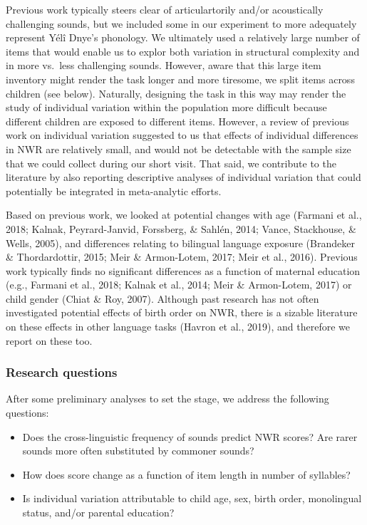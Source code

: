 \documentclass[english,,man,floatsintext]{apa6}
\providecommand{\tightlist}{%
  \setlength{\itemsep}{0pt}\setlength{\parskip}{0pt}}
\begin{document}
Previous work typically steers clear of articulartorily and/or
acoustically challenging sounds, but we included some in our experiment
to more adequately represent Yélî Dnye's phonology. We ultimately used a
relatively large number of items that would enable us to explor both
variation in structural complexity and in more vs.~less challenging
sounds. However, aware that this large item inventory might render the
task longer and more tiresome, we split items across children (see
below). Naturally, designing the task in this way may render the study
of individual variation within the population more difficult because
different children are exposed to different items. However, a review of
previous work on individual variation suggested to us that effects of
individual differences in NWR are relatively small, and would not be
detectable with the sample size that we could collect during our short
visit. That said, we contribute to the literature by also reporting
descriptive analyses of individual variation that could potentially be
integrated in meta-analytic efforts.

Based on previous work, we looked at potential changes with age (Farmani
et al., 2018; Kalnak, Peyrard-Janvid, Forssberg, \& Sahlén, 2014; Vance,
Stackhouse, \& Wells, 2005), and differences relating to bilingual
language exposure (Brandeker \& Thordardottir, 2015; Meir \&
Armon-Lotem, 2017; Meir et al., 2016). Previous work typically finds no
significant differences as a function of maternal education (e.g.,
Farmani et al., 2018; Kalnak et al., 2014; Meir \& Armon-Lotem, 2017) or
child gender (Chiat \& Roy, 2007). Although past research has not often
investigated potential effects of birth order on NWR, there is a sizable
literature on these effects in other language tasks (Havron et al.,
2019), and therefore we report on these too.

\subsubsection{Research questions}\label{research-questions}

After some preliminary analyses to set the stage, we address the
following questions:

\begin{itemize}
\tightlist
\item
  Does the cross-linguistic frequency of sounds predict NWR scores? Are
  rarer sounds more often substituted by commoner sounds?
\item
  How does score change as a function of item length in number of
  syllables?
\item
  Is individual variation attributable to child age, sex, birth order,
  monolingual status, and/or parental education?
\end{itemize}
\end{document}
